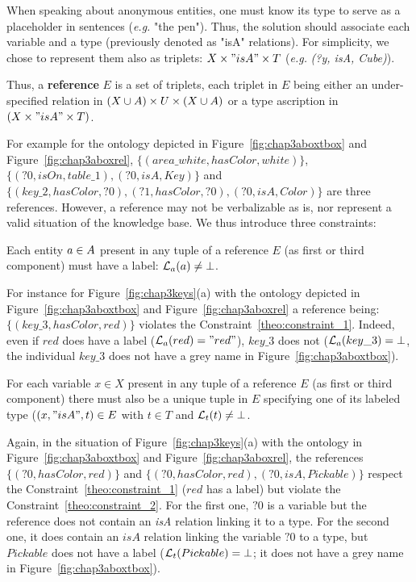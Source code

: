 \documentclass[a4paper,11pt,twoside]{StyleThese}
\begin{document}
When speaking about anonymous entities, one must know its type to serve as a placeholder in sentences (\textit{e.g.} "the pen").
Thus, the solution should associate each variable and a type (previously denoted as "isA" relations). For simplicity, we chose to represent them also as triplets: $X \times "isA" \times T$ (\textit{e.g.} \textit{(?y, isA, Cube)}). 

\begin{definition}[Reference]
\label{def:reference}
Thus, a \textbf{reference} $E$ is a set of triplets, each triplet in $E$ being either an under-specified relation in $(X \cup A) \times U \times (X \cup A)$ or a type ascription in  $(X \times "isA" \times T)$.
\end{definition}

For example for the ontology depicted in Figure~\ref{fig:chap3aboxtbox} and Figure~\ref{fig:chap3aboxrel}, $\{(area\_white, hasColor, white)\}$, $\{(?0, isOn, table\_1), (?0, isA, Key)\}$ and $\{(key\_2, hasColor, ?0), (?1, hasColor, ?0), (?0, isA, Color)\}$ are three references. However, a reference may not be verbalizable as is, nor represent a valid situation of the knowledge base. We thus introduce three constraints:

\begin{constraint}
\label{theo:constraint_1}
Each entity $a \in A$ present in any tuple of a reference $E$ (as first or third component) must have a label: $\mathcal{L}_a(a) \neq \bot$.
\end{constraint}

For instance for Figure~\ref{fig:chap3keys}(a) with the ontology depicted in Figure~\ref{fig:chap3aboxtbox} and Figure~\ref{fig:chap3aboxrel} a reference being: $\{(key\_3, hasColor, red)\}$ violates the Constraint~\ref{theo:constraint_1}. Indeed, even if $red$ does have a label ($\mathcal{L}_a(red) = "red"$), $key\_3$ does not ($\mathcal{L}_a(key\_3) = \bot$, the individual $key\_3$ does not have a grey name in Figure~\ref{fig:chap3aboxtbox}).

\begin{constraint}
\label{theo:constraint_2}
For each variable $x \in X$ present in any tuple of a reference $E$ (as first or third component) there must also be a unique tuple in $E$ specifying one of its labeled type ($(x, "isA", t) \in E$ with $t \in T$ and $\mathcal{L}_t(t) \neq \bot$.
\end{constraint}

Again, in the situation of Figure~\ref{fig:chap3keys}(a) with the ontology in Figure~\ref{fig:chap3aboxtbox} and Figure~\ref{fig:chap3aboxrel}, the references $\{(?0, hasColor, red)\}$ and $\{(?0, hasColor, red), (?0, isA, Pickable)\}$ respect the Constraint~\ref{theo:constraint_1} ($red$ has a label) but violate the Constraint~\ref{theo:constraint_2}. For the first one, $?0$ is a variable but the reference does not contain an \textit{isA} relation linking it to a type. For the second one, it does contain an $isA$ relation linking the variable $?0$ to a type, but $Pickable$ does not have a label ($\mathcal{L}_t(Pickable) = \bot$; it does not have a grey name in Figure~\ref{fig:chap3aboxtbox}).
\end{document}
